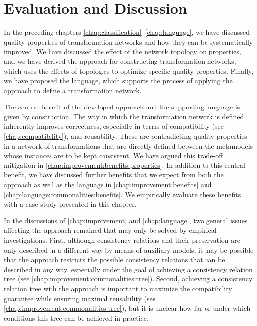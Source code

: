 \chapter{Evaluation and Discussion 
}
\label{chap:commonalities_evaluation}

In the preceding chapters \ref{chap:classification}--\ref{chap:language}, we have discussed quality properties of transformation networks and how they can be systematically improved.
We have discussed the effect of the network topology on properties, and we have derived the \commonalities approach for constructing transformation networks, which uses the effects of topologies to optimize specific quality properties.
Finally, we have proposed the \commonalities language, which supports the process of applying the \commonalities approach to define a transformation network.

The central benefit of the developed \commonalities approach and the supporting \commonalities language is given by construction.
The way in which the transformation network is defined inherently improves correctness, especially in terms of compatibility (see \autoref{chap:compatibility}), and reusability. 
These are contradicting quality properties in a network of transformations that are directly defined between the metamodels whose instances are to be kept consistent.
We have argued this trade-off mitigation in \autoref{chap:improvement:benefits:properties}.
In addition to this central benefit, we have discussed further benefits that we expect from both the \commonalities approach as well as the \commonalities language in \autoref{chap:improvement:benefits} and \autoref{chap:language:commonalities:benefits}.
We empirically evaluate these benefits with a case study presented in this chapter.

In the discussions of \autoref{chap:improvement} and \autoref{chap:language}, two general issues affecting the \commonalities approach remained that may only be solved by empirical investigations.
First, although consistency relations and their preservation are only described in a different way by means of auxiliary models, it may be possible that the approach restricts the possible consistency relations that can be described in any way, especially under the goal of achieving a consistency relation tree (see \autoref{chap:improvement:commonalities:tree}).
Second, achieving a consistency relation tree with the approach is important to maximize the compatibility guarantee while ensuring maximal reusability (see \autoref{chap:improvement:commonalities:tree}), but it is unclear how far or under which conditions this tree can be achieved in practice.

